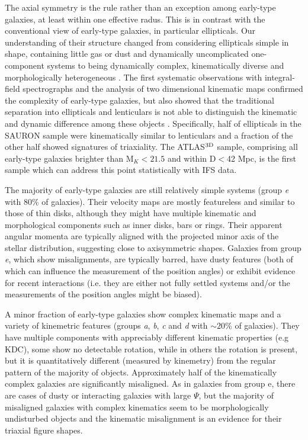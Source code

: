 \documentclass[usenatbib,usegraphicx]{mn2e}
\begin{document}
The axial symmetry is the rule rather than an exception among early-type galaxies, at least within one effective radus. This is in contrast with the conventional view of early-type galaxies, in particular ellipticals. Our understanding of their structure changed from considering ellipticals simple in shape, containing little gas or dust and dynamically uncomplicated one-component systems \citep[e.g.][]{1977ARA&A..15..235G} to being dynamically complex, kinematically diverse and morphologically heterogeneous \citep[e.g.][]{1982ARA&A..20..399B, 1989ARA&A..27..235K,1991ARA&A..29..239D,1994AJ....108.1567J,1997AJ....114.1771F,2000A&AS..144...53K,2004MNRAS.352..721E, 2009ApJS..182..216K}. The first systematic observations with integral-field spectrographs and the analysis of two dimensional kinematic maps confirmed the complexity of early-type galaxies, but also showed that the traditional separation into ellipticals and lenticulars is not able to distinguish the kinematic and dynamic difference among these objects \citep{2007MNRAS.379..401E,2007MNRAS.379..418C}. Specifically, half of ellipticals in the SAURON sample were kinematically similar to lenticulars and a fraction of the other half showed signatures of triaxiality. The ATLAS$^{\rm 3D}$ sample, comprising all early-type galaxies brighter than M$_K<21.5$ and within D$<$42 Mpc, is the first sample which can address this point statistically with IFS data.

The majority of early-type galaxies are still relatively simple systems (group {\it e} with 80\% of galaxies). Their velocity maps are mostly featureless and similar to those of thin disks, although they might have multiple kinematic and morphological components such as inner disks, bars or rings. Their apparent angular momenta are typically aligned with the projected minor axis of the stellar distribution, suggesting close to axisymmetric shapes. Galaxies from group {\it e}, which show misalignments, are typically barred, have dusty features (both of which can influence the measurement of the position angles) or exhibit evidence for recent interactions (i.e. they are either not fully settled systems and/or the measurements of the position angles might be biased). 

A minor fraction of early-type galaxies show complex kinematic maps and a variety of kinemetric features (groups {\it a}, {\it b}, {\it c} and {\it d} with $\sim 20$\% of galaxies). They have multiple components with appreciably different kinematic properties (e.g KDC), some show no detectable rotation, while in others the rotation is present, but it is quantitatively different (measured by kinemetry) from the regular pattern of the majority of objects. Approximately half of the kinematically complex galaxies are significantly misaligned. As in galaxies from group {e}, there are cases of dusty or interacting galaxies with large $\Psi$, but the majority of misaligned galaxies with complex kinematics seem to be morphologically undisturbed objects and the kinematic misalignment is an evidence for their triaxial figure shapes. 
\end{document}
